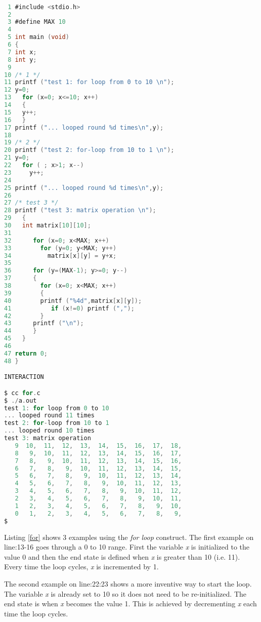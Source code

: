 \begin{lstlisting}[language=C,showstringspaces=false, caption={File for.c, for...loop base examples},captionpos=b,label=for]

 1 #include <stdio.h>
 2 
 3 #define MAX 10
 4 
 5 int main (void)
 6 {
 7 int x;
 8 int y;
 9 
10 /* 1 */ 
11 printf ("test 1: for loop from 0 to 10 \n");
12 y=0;
13   for (x=0; x<=10; x++)
14   {
15   y++;
16   }
17 printf ("... looped round %d times\n",y);
18 
19 /* 2 */
20 printf ("test 2: for-loop from 10 to 1 \n");
21 y=0;
22   for ( ; x>1; x--)
23     y++;
24 
25 printf ("... looped round %d times\n",y);
26 
27 /* test 3 */
28 printf ("test 3: matrix operation \n");
29   {
30   int matrix[10][10];
31 
32      for (x=0; x<MAX; x++)
33        for (y=0; y<MAX; y++)
34          matrix[x][y] = y+x;
35    
36      for (y=(MAX-1); y>=0; y--)
37      {
38        for (x=0; x<MAX; x++)
39        {
40        printf ("%4d",matrix[x][y]);
41           if (x!=0) printf (",");
42        }
43      printf ("\n");
44      }
45   }
46 
47 return 0;
48 }

INTERACTION

$ cc for.c
$ ./a.out
test 1: for loop from 0 to 10 
... looped round 11 times
test 2: for-loop from 10 to 1 
... looped round 10 times
test 3: matrix operation 
   9  10,  11,  12,  13,  14,  15,  16,  17,  18,
   8   9,  10,  11,  12,  13,  14,  15,  16,  17,
   7   8,   9,  10,  11,  12,  13,  14,  15,  16,
   6   7,   8,   9,  10,  11,  12,  13,  14,  15,
   5   6,   7,   8,   9,  10,  11,  12,  13,  14,
   4   5,   6,   7,   8,   9,  10,  11,  12,  13,
   3   4,   5,   6,   7,   8,   9,  10,  11,  12,
   2   3,   4,   5,   6,   7,   8,   9,  10,  11,
   1   2,   3,   4,   5,   6,   7,   8,   9,  10,
   0   1,   2,   3,   4,   5,   6,   7,   8,   9,
$
\end{lstlisting}

Listing \ref{for} shows 3 examples using the \textit{for loop} construct. The first example on line:13-16 goes through a 0 to 10 range. First the variable \textit{x} is initialized to the value 0 and then the end state is defined when \textit{x} is greater than 10 (i.e. 11). Every time the loop cycles, \textit{x} is incremented by 1.

The second example on line:22:23 shows a more inventive way to start the loop. The variable \textit{x} is already set to 10 so it does not need to be re-initialized. The end state is when \textit{x} becomes the value 1. This is achieved by decrementing \textit{x} each time the loop cycles.


